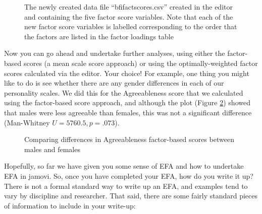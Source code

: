 \begin{figure}[!htp]
\begin{center}
\caption{The newly created data file “bfifactscores.csv” created in the  editor and containing the five factor score variables. Note that each of the new factor score variables is labelled corresponding to the order that the factors are listed in the factor loadings table}
\label{fig:fa11}
\HR
\end{center}
\end{figure}

Now you can go ahead and undertake further analyses, using either the factor-based scores (a mean scale score approach) or using the optimally-weighted factor scores calculated via the  editor. Your choice! For example, one thing you might like to do is see whether there are any gender differences in each of our personality scales. We did this for the Agreeableness score that we calculated using the factor-based score approach, and although the plot (Figure \ref{fig:fa12}) showed that males were less agreeable than females, this was not a significant difference (Man-Whitney $U=5760.5, p=.073$).

\begin{figure}[!htb]
\begin{center}
\caption{Comparing differences in Agreeableness factor-based scores between males and females}
\label{fig:fa12}
\HR
\end{center}
\end{figure}



Hopefully, so far we have given you some sense of EFA and how to undertake EFA in jamovi. So, once you have completed your EFA, how do you write it up? There is not a formal standard way to write up an EFA, and examples tend to vary by discipline and researcher. That said, there are some fairly standard pieces of information to include in your write-up: 

